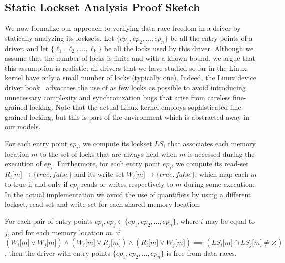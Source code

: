 \subsection{Static Lockset Analysis Proof Sketch}
\label{whoop:proof}

We now formalize our approach to verifying data race freedom in a driver by statically analyzing its locksets. Let $\{\mathit{ep}_{1}, \mathit{ep}_{2}, \dotsc, \mathit{ep}_{n}\}$ be all the entry points of a driver, and let $\{\ell_{1}, \ell_{2}, \dotsc, \ell_{k}\}$ be all the locks used by this driver. Although we assume that the number of locks is finite and with a known bound, we argue that this assumption is realistic: all drivers that we have studied so far in the Linux kernel have only a small number of locks (typically one). Indeed, the Linux device driver book~\cite{corbet2005linux} advocates the use of as few locks as possible to avoid introducing unnecessary complexity and synchronization bugs that arise from careless fine-grained locking. Note that the actual Linux kernel employs sophisticated fine-grained locking, but this is part of the environment which is abstracted away in our models.

For each entry point $\mathit{ep}_{i}$, we compute its lockset $\mathit{LS}_{i}$ that associates each memory location $m$ to the set of locks that are always held when $m$ is accessed during the execution of $\mathit{ep}_{i}$. Furthermore, for each entry point $\mathit{ep}_{i}$, we compute its read-set $R_{i}\lbrack m\rbrack \rightarrow \{true, false\}$ and its write-set $W_{i}\lbrack m\rbrack \rightarrow \{true, false\}$, which map each $m$ to true if and only if $\mathit{ep}_{i}$ reads or writes respectively to $m$ during some execution. In the actual implementation we avoid the use of quantifiers by using a different lockset, read-set and write-set for each shared memory location.

\begin{theorem}
\label{theorem:locksets}
For each pair of entry points $\mathit{ep}_{i}, \mathit{ep}_{j}\in \{\mathit{ep}_{1}, \mathit{ep}_{2}, ..., \mathit{ep}_{n}\}$, where $i$ may be equal to $j$, and for each memory location $m$, if $(W_{i}\lbrack m\rbrack \vee W_{j}\lbrack m\rbrack) \wedge (W_{i}\lbrack m\rbrack \vee R_{j}\lbrack m\rbrack) \wedge (R_{i}\lbrack m\rbrack \vee W_{j}\lbrack m\rbrack) \implies (\mathit{LS}_{i}\lbrack m\rbrack \cap \mathit{LS}_{j}\lbrack m\rbrack \not= \varnothing)$, then the driver with entry points $\{\mathit{ep}_{1}, \mathit{ep}_{2}, \dotsc, \mathit{ep}_{n}\}$ is free from data races.
\end{theorem}

